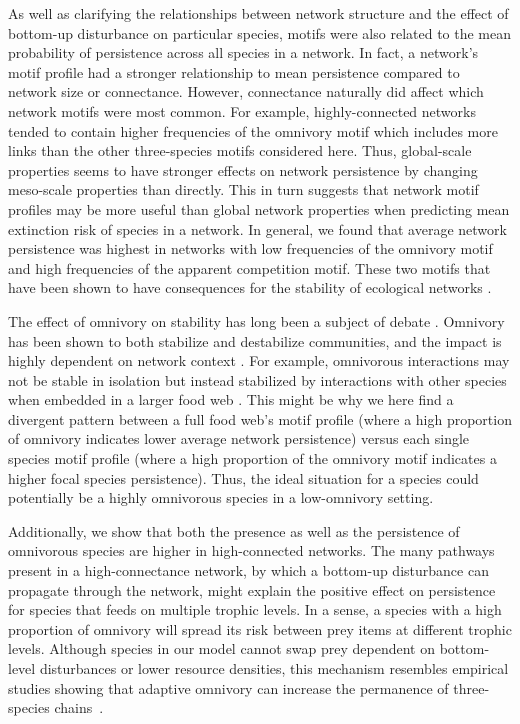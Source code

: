 \documentclass[12pt]{article}
\begin{document}
\begin{spacing}{2.0}
As well as clarifying the relationships between network structure and the effect of bottom-up disturbance on particular species, motifs were also related to the mean probability of persistence across all species in a network.
In fact, a network's motif profile had a stronger relationship to mean persistence compared to network size or connectance. 
However, connectance naturally did affect which network motifs were most common. 
For example, highly-connected networks tended to contain higher frequencies of the omnivory motif which includes more links than the other three-species motifs considered here.
Thus, global-scale properties seems to have stronger effects on network persistence by changing meso-scale properties than directly.
This in turn suggests that network motif profiles may be more useful than global network properties when predicting mean extinction risk of species in a network.
In general, we found that average network persistence was highest in networks with low frequencies of the omnivory motif and high frequencies of the apparent competition motif. These two motifs that have been shown to have consequences for the stability of ecological networks \citep{Borrelli2015a}.

The effect of omnivory on stability has long been a subject of debate \citep{Kratina2012}. 
Omnivory has been shown to both stabilize and destabilize communities, and the impact is highly dependent on network context \citep{bascompte2005simple, Monteiro2016}. 
For example, omnivorous interactions may not be stable in isolation but instead stabilized by interactions with other species when embedded in a larger food web \citep{Kratina2012}. 
This might be why we here find a divergent pattern between a full food web's motif profile (where a high proportion of omnivory indicates lower average network persistence) versus each single species motif profile (where a high proportion of the omnivory motif indicates a higher focal species persistence).
Thus, the ideal situation for a species could potentially be a highly omnivorous species in a low-omnivory setting. 

Additionally, we show that both the presence as well as the persistence of omnivorous species are higher in high-connected networks.
The many pathways present in a high-connectance network, by which a bottom-up disturbance can propagate through the network, might explain the positive effect on persistence for species that feeds on multiple trophic levels.
In a sense, a species with a high proportion of omnivory will spread its risk between prey items at different trophic levels.
Although species in our model cannot swap prey dependent on bottom-level disturbances or lower resource densities, this mechanism resembles empirical studies showing that adaptive omnivory can increase the permanence of three-species chains~\citep{Fagan1997, Kvrivan2005, AbramsFung2010}.


\end{spacing}
\end{document}
